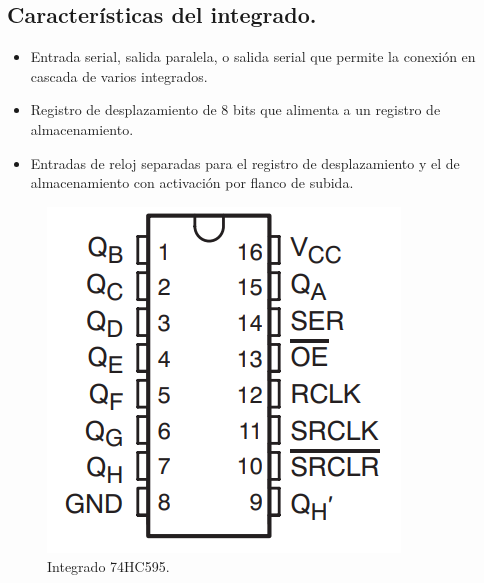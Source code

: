 \documentclass{article}
\begin{document}
\subsection{Características del integrado.}\label{caracteristicas}
 \begin{itemize}
 
\item Entrada serial, salida paralela, o salida serial que permite la conexión en cascada de varios integrados.
\item Registro de desplazamiento de 8 bits que alimenta a un registro de almacenamiento.
\item Entradas de reloj separadas para el registro de desplazamiento y el de almacenamiento con activación por flanco de subida.

\end{itemize}

\begin{figure}[h]
\includegraphics[scale=1]{esquematico.png}
\centering
\caption{Integrado 74HC595.}
\label{fig:int74HC959}
\end{figure}
\end{document}
